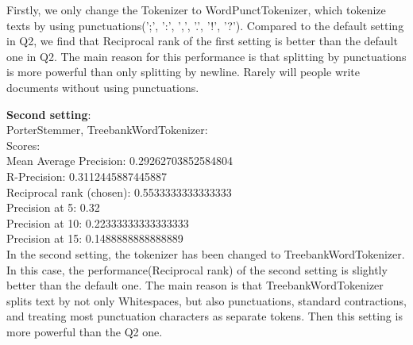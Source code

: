 \documentclass{article}
\begin{document}
Firstly, we only change the Tokenizer to WordPunctTokenizer, which tokenize 
texts by using punctuations(';', ':', ',', '.', '!', '?'). Compared to the 
default setting in Q2, we find that Reciprocal rank of the first setting is 
 better than the default one in Q2. The main reason for this performance 
is that splitting by punctuations is more powerful than only splitting by newline.
Rarely will people write documents without using punctuations.




\noindent
\textbf{Second setting}:\\
PorterStemmer, TreebankWordTokenizer:\\
Scores:\\
Mean Average Precision: 0.29262703852584804\\
R-Precision: 0.3112445887445887\\
Reciprocal rank (chosen): 0.5533333333333333\\
Precision at 5: 0.32\\
Precision at 10: 0.22333333333333333\\
Precision at 15: 0.1488888888888889\\

In the second setting, the tokenizer has been changed to TreebankWordTokenizer. 
In this case, the performance(Reciprocal rank) of the second setting is slightly 
better than the default one. The main reason is that TreebankWordTokenizer splits 
text by not only Whitespaces, but also punctuations, standard 
contractions, and treating most punctuation characters as separate tokens. Then 
this setting is more powerful than the Q2 one. 
\end{document}
